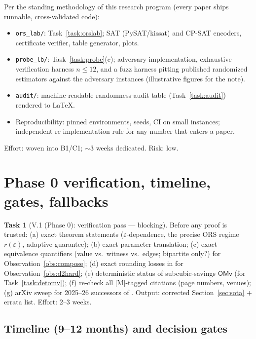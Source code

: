 \documentclass[11pt]{article}
\theoremstyle{definition}
\newtheorem{task}{Task}
\theoremstyle{remark}
\newcommand{\statusM}{\textcolor{orange!80!black}{\textsf{[M]}}}
\newcommand{\OMv}{\mathsf{OMv}}
\newcommand{\eps}{\varepsilon}
\begin{document}
Per the standing methodology of this research program (every paper ships
runnable, cross-validated code):

\begin{itemize}[itemsep=2pt]
\item \texttt{ors\_lab/}: Task~\ref{task:orslab}; SAT (PySAT/kissat) and
CP-SAT encoders, certificate verifier, table generator, plots.
\item \texttt{probe\_lb/}: Task~\ref{task:probe}(c); adversary
implementation, exhaustive verification harness $n\le 12$, and a fuzz
harness pitting published randomized estimators against the adversary
instances (illustrative figures for the note).
\item \texttt{audit/}: machine-readable randomness-audit table
(Task~\ref{task:audit}) rendered to LaTeX.
\item Reproducibility: pinned environments, seeds, CI on small
instances; independent re-implementation rule for any number that
enters a paper.
\end{itemize}
Effort: woven into B1/C1; ${\sim}3$ weeks dedicated. Risk: low.

\section{Phase 0 verification, timeline, gates, fallbacks}
\label{sec:timeline}

\begin{task}[V.1 (Phase 0): verification pass --- blocking]
\label{task:verify}
Before any proof is trusted: (a) exact \cite{AKK25} theorem statements
($\eps$-dependence, the precise ORS regime $r(\eps)$, adaptive
guarantee); (b) exact \cite{Pra26} parameter translation; (c) exact
\cite{Liu24} equivalence quantifiers (value vs.\ witness vs.\ edges;
bipartite only?) for Observation~\ref{obs:compose}; (d) exact rounding
losses in \cite{BK21,ACCSW18} for Observation~\ref{obs:d2hard}; (e)
deterministic status of subcubic-savings $\OMv$ (for
Task~\ref{task:detomv}); (f) re-check all \statusM-tagged citations
(page numbers, venues); (g) arXiv sweep for 2025--26 successors of
\cite{BBKS25,ABR24,AKK25}. Output: corrected Section~\ref{sec:sota} +
errata list. Effort: 2--3 weeks.
\end{task}

\subsection{Timeline (9--12 months) and decision gates}
\end{document}
